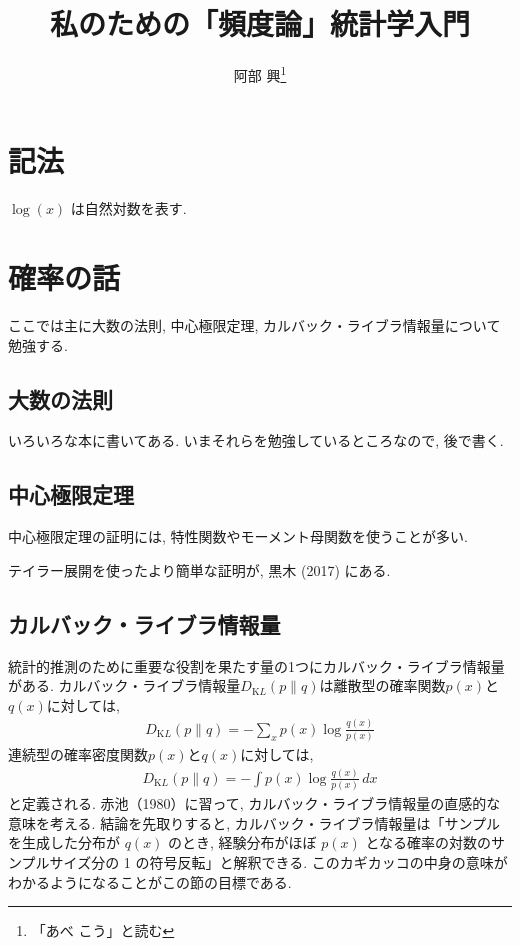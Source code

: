 \documentclass[a4paper, 12pt]{jarticle}
\title{私のための「頻度論」統計学入門}
\author{阿部 興\footnote{「あべ こう」と読む}}
\begin{document}
\maketitle
\tableofcontents

\theoremstyle{definition}
\newtheorem{theorem}{定理}
\newtheorem*{theorem*}{定理}
\newtheorem{definition}[theorem]{定義}
\newtheorem*{definition*}{定義}

\newcommand{\KL}{D_{\mathrm KL}}

\section*{記法}

$\log(x)$ は自然対数を表す.

\section{確率の話}
ここでは主に大数の法則, 中心極限定理, カルバック・ライブラ情報量について勉強する.

\subsection{大数の法則}

いろいろな本に書いてある. いまそれらを勉強しているところなので,  後で書く.

\subsection{中心極限定理}

中心極限定理の証明には, 特性関数やモーメント母関数を使うことが多い. 

テイラー展開を使ったより簡単な証明が, 黒木 (2017) にある. 

\subsection{カルバック・ライブラ情報量}
統計的推測のために重要な役割を果たす量の1つにカルバック・ライブラ情報量がある.
カルバック・ライブラ情報量$\KL(p\|q)$は離散型の確率関数$p(x)$と$q(x)$に対しては, 
\begin{align}
\KL(p\|q) = -\sum_{x} p(x) \log \frac{q(x)}{p(x)}
\end{align}
連続型の確率密度関数$p(x)$と$q(x)$に対しては, 
\begin{align}
\KL(p\|q) = -\int p(x) \log \frac{q(x)}{p(x)} \, dx
\end{align}
と定義される. 
赤池（1980）に習って, カルバック・ライブラ情報量の直感的な意味を考える. 結論を先取りすると, カルバック・ライブラ情報量は「サンプルを生成した分布が $q(x)$ のとき, 経験分布がほぼ $p(x)$ となる確率の対数のサンプルサイズ分の 1 の符号反転」と解釈できる. このカギカッコの中身の意味がわかるようになることがこの節の目標である.
\end{document}
